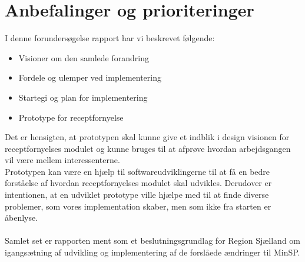 \section{Anbefalinger og prioriteringer}
I denne forundersøgelse rapport har vi beskrevet følgende:
\begin{itemize}
	\item Visioner om den samlede forandring
	\item Fordele og ulemper ved implementering
	\item Startegi og plan for implementering
	\item Prototype for receptfornyelse
\end{itemize}
Det er hensigten, at prototypen skal kunne give et indblik i design visionen for receptfornyelses modulet og kunne bruges til at afprøve hvordan arbejdsgangen vil være mellem interessenterne.\\
Prototypen kan være en hjælp til softwareudviklingerne til at få en bedre forståelse af hvordan receptfornyelses modulet skal udvikles. Derudover er intentionen, at en udviklet prototype ville hjælpe med til at finde diverse problemer, som vores implementation skaber, men som ikke fra starten er åbenlyse. \\\\
Samlet set er rapporten ment som et beslutningsgrundlag for Region Sjælland om igangsætning af udvikling og implementering af de forslåede ændringer til MinSP.
